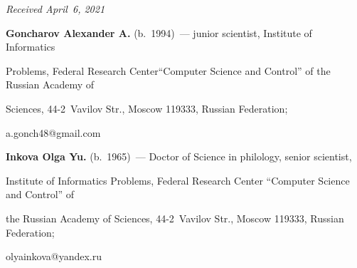   \hfill{\small\textit{Received April~6, 2021}}


















\Contr





\noindent


\textbf{Goncharov Alexander A.} (b.\ 1994)~--- junior scientist, Institute of Informatics 


Problems, Federal Research Center``Computer Science and Control'' of the Russian Academy of 


Sciences, 44-2~Vavilov Str., Moscow 119333, Russian Federation; 


\mbox{a.gonch48@gmail.com}





\vspace*{6pt}





\noindent


\textbf{Inkova Olga Yu.} (b.\ 1965)~--- Doctor of Science  in philology, senior scientist, 


Institute of Informatics Problems, Federal Research Center ``Computer Science and Control'' of 


the Russian Academy of Sciences, 44-2~Vavilov Str., Moscow 119333, Russian Federation; 


\mbox{olyainkova@yandex.ru}





\label{end\stat}





\renewcommand{\bibname}{\protect\rm Литература}


